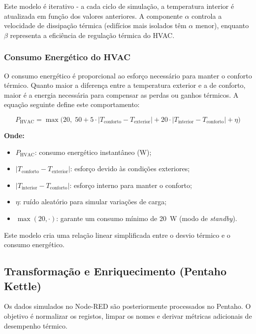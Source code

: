 \documentclass[a4paper, 12pt]{article} %
\begin{document}
Este modelo é iterativo - a cada ciclo de simulação, a temperatura interior é atualizada em função dos valores anteriores.  
A componente $\alpha$ controla a velocidade de dissipação térmica (edifícios mais isolados têm $\alpha$ menor), enquanto $\beta$ representa a eficiência de regulação térmica do HVAC.



\subsubsection*{Consumo Energético do HVAC}

O consumo energético é proporcional ao esforço necessário para manter o conforto térmico.  
Quanto maior a diferença entre a temperatura exterior e a de conforto, maior é a energia necessária para compensar as perdas ou ganhos térmicos.  
A equação seguinte define este comportamento:

\[
P_{\text{HVAC}} = \max \Big(20,\; 50 + 5 \cdot |T_{\text{conforto}} - T_{\text{exterior}}| + 20 \cdot |T_{\text{interior}} - T_{\text{conforto}}| + \eta \Big)
\]

\textbf{Onde:}
\begin{itemize}[nosep]
	\item $P_{\text{HVAC}}$: consumo energético instantâneo (W);
	\item $|T_{\text{conforto}} - T_{\text{exterior}}|$: esforço devido às condições exteriores;
	\item $|T_{\text{interior}} - T_{\text{conforto}}|$: esforço interno para manter o conforto;
	\item $\eta$: ruído aleatório para simular variações de carga;
	\item $\max(20, \cdot)$: garante um consumo mínimo de 20~W (modo de \textit{standby}). \\
\end{itemize}

Este modelo cria uma relação linear simplificada entre o desvio térmico e o consumo energético.

\subsection{Transformação e Enriquecimento (Pentaho Kettle)}

Os dados simulados no Node-RED são posteriormente processados no Pentaho.  
O objetivo é normalizar os registos, limpar os nomes e derivar métricas adicionais de desempenho térmico.
\end{document}
